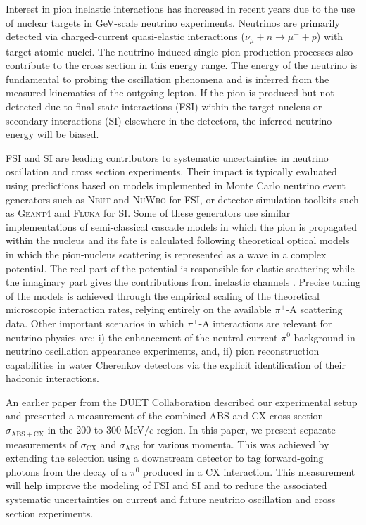 Interest in pion inelastic interactions has increased in recent years due to the use of nuclear targets in GeV-scale neutrino experiments. Neutrinos are primarily detected via charged-current quasi-elastic interactions {\color{red}($\nu_{\mu}+n\rightarrow \mu^{-} + p$)} with target atomic nuclei. The neutrino-induced single pion production processes also contribute to the cross section in this energy range. The energy of the neutrino is fundamental to probing the oscillation phenomena and is inferred from the measured kinematics of the outgoing lepton.  If the pion is produced but not detected due to final-state interactions (FSI) within the target nucleus or secondary interactions (SI) elsewhere in the detectors, the inferred neutrino energy will be biased. 

FSI and SI are leading contributors to systematic uncertainties in neutrino oscillation and cross section experiments. Their impact is typically evaluated using predictions based on models implemented in Monte Carlo neutrino event generators such as \textsc{Neut} \cite{NEUT} and \textsc{NuWro} \cite{NuWro} for FSI, or detector simulation toolkits such as \textsc{Geant4} \cite{bertini} and \textsc{Fluka} \cite{fluka1,fluka2} for SI. Some of these generators use similar implementations of semi-classical cascade models in which the pion is propagated within the nucleus and its fate is calculated following theoretical optical models in which the pion-nucleus scattering is represented as a wave in a complex potential. The real part of the potential is responsible for elastic scattering while the imaginary part gives the contributions from inelastic channels \cite{Oset,Salcedo}. Precise tuning of the models is achieved through the empirical scaling of the theoretical microscopic interaction rates, relying entirely on the available $\pi^{\pm}$-A scattering data. Other important scenarios in which $\pi^{\pm}$-A interactions are relevant for neutrino physics are: i) the enhancement of the neutral-current $\pi^{0}$ background in neutrino oscillation appearance experiments, and, ii) pion reconstruction capabilities in water Cherenkov detectors via the explicit identification of their hadronic interactions.

An earlier paper from the DUET Collaboration \cite{duet} described our experimental setup and presented a measurement of the combined ABS and CX cross section $\sigma_{\mathrm{ABS}+\mathrm{CX}}$ in the 200 to 300 MeV$/c$ region. In this paper, we present separate measurements of $\sigma_{\mathrm{CX}}$ and $\sigma_{\mathrm{ABS}}$ for various momenta. This was achieved by extending the selection using a downstream detector to tag forward-going photons from the decay of a $\pi^0$ produced in a CX interaction. This measurement will help improve the modeling of FSI and SI and to reduce the associated systematic uncertainties on current and future neutrino oscillation and cross section experiments.
